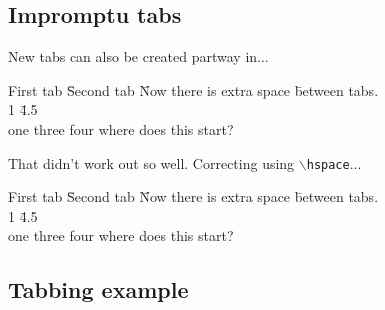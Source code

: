 \documentclass[11pt]{article} %
\begin{document}
\subsection{Impromptu tabs}
\label{impromptuTabs}

New tabs can also be created partway in...
\begin{tabbing}
First tab\hspace{0.2cm} \= Second tab\hspace{0.2cm} \= Now there is extra space\hspace{0.2cm} \= between tabs. \\
1    \= 4.5 \\
one \> \> three \> four \> where does this start?
\end{tabbing}

That didn't work out so well. Correcting using \texttt{$\backslash$hspace}...
\begin{tabbing}
First tab\hspace{0.2cm} \= Second tab\hspace{0.2cm} \= Now there is extra space\hspace{0.2cm} \= between tabs. \\ [2ex]  %
1   \hspace{1.0cm} \= 4.5 \\
one \> \> three \> four \> where does this start?
\end{tabbing}

\subsection{Tabbing example}
\end{document}
